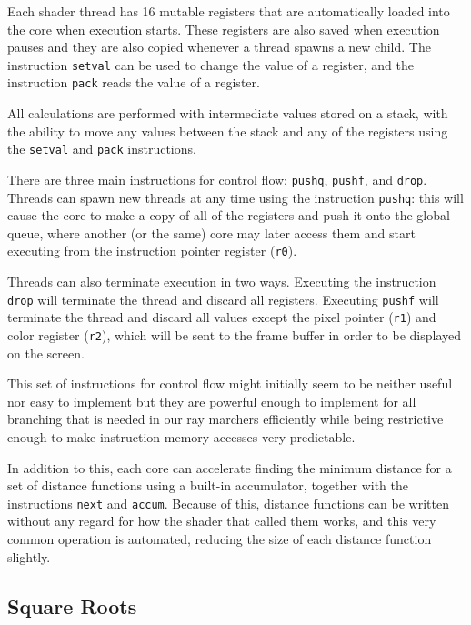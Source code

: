 			Each shader thread has 16 mutable registers that are automatically
			loaded into the core when execution starts. These registers are
			also saved when execution pauses and they are also copied whenever
			a thread spawns a new child. The instruction \texttt{setval} can be
			used to change the value of a register, and the instruction
			\texttt{pack} reads the value of a register.

			All calculations are performed with intermediate values stored on a
			stack, with the ability to move any values between the stack and
			any of the registers using the \texttt{setval} and \texttt{pack}
			instructions.

			There are three main instructions for control flow: \texttt{pushq},
			\texttt{pushf}, and \texttt{drop}. Threads can spawn new threads at
			any time using the instruction \texttt{pushq}: this will cause the
			core to make a copy of all of the registers and push it onto the
			global queue, where another (or the same) core may later access
			them and start executing from the instruction pointer register
			(\texttt{r0}).

			Threads can also terminate execution in two ways. Executing the
			instruction \texttt{drop} will terminate the thread and discard all
			registers. Executing \texttt{pushf} will terminate the thread and
			discard all values except the pixel pointer (\texttt{r1}) and color
			register (\texttt{r2}), which will be sent to the frame buffer in
			order to be displayed on the screen.

			This set of instructions for control flow might initially seem to
			be neither useful nor easy to implement but they are powerful
			enough to implement for all branching that is needed in our ray
			marchers efficiently while being restrictive enough to make
			instruction memory accesses very predictable.

			In addition to this, each core can accelerate finding the minimum 
			distance for a set of distance functions using a built-in 
			accumulator, together with the instructions \texttt{next} and 
			\texttt{accum}. Because of this, distance functions can be written
			without any regard for how the shader that called them works, and
			this very common operation is automated, reducing the size of each
			distance function slightly.

		\subsection{Square Roots}

